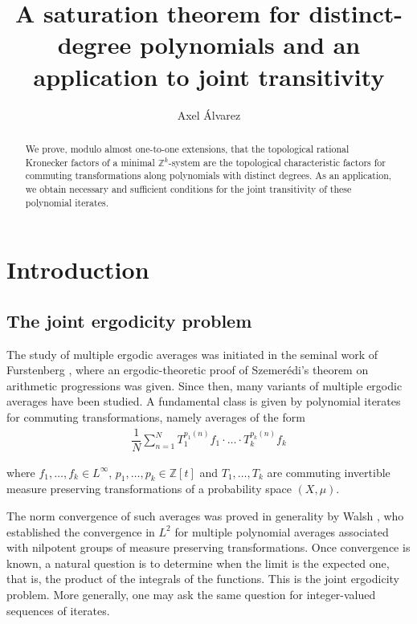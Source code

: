 \documentclass[11pt,reqno]{amsart}
\title{A saturation theorem for distinct-degree polynomials and an application to joint transitivity}
\date{}
\author{Axel \'Alvarez}
\newcommand{\Z}{\mathbb{Z}}
\theoremstyle{definition}
\theoremstyle{remark}
\begin{document}



\begin{abstract}
    We prove, modulo almost one-to-one extensions, that the topological rational Kronecker factors of a minimal $\Z^k$-system are the topological characteristic factors for commuting transformations along polynomials with distinct degrees. As an application, we obtain necessary and sufficient conditions for the joint transitivity of these polynomial iterates.
\end{abstract}

\maketitle

\section{Introduction}

\subsection{The joint ergodicity problem}

The study of multiple ergodic averages was initiated in the seminal work of Furstenberg \cite{Furstenberg_ergodic_szemeredi:1977}, where an ergodic-theoretic proof of Szemerédi’s theorem on arithmetic progressions was given. Since then, many variants of multiple ergodic averages have been studied. A fundamental class is given by polynomial iterates for commuting transformations, namely averages of the form\begin{align*}
    \dfrac{1}{N} \sum_{n=1}^{N} T_1^{p_1(n)}f_1\cdot \ldots \cdot T_k^{p_k(n)}f_k
\end{align*}

where $f_1,\dots,f_k\in L^{\infty}$, $p_1,\dots,p_k\in \Z[t]$ and $T_1,\dots,T_k$ are commuting invertible measure preserving transformations of a probability space $(X,\mu)$. 

The norm convergence of such averages was proved in generality by Walsh \cite{Walsh12}, who established the convergence in $L^2$ for multiple polynomial averages associated with nilpotent groups of measure preserving transformations. Once convergence is known, a natural question is to determine when the limit is the expected one, that is, the product of the integrals of the functions. This is the joint ergodicity problem. More generally, one may ask the same question for integer-valued sequences of iterates.
\end{document}
